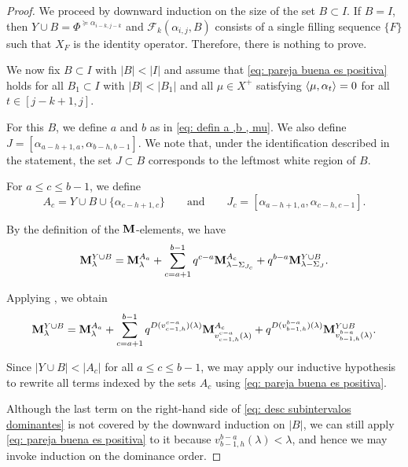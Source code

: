 \begin{proof}  
   We proceed by downward induction on the size of the set $B\subset I$. 
   If $B=I$, then $Y\cup B = \Phi^{\succeq \alpha_{i-k,j-k}}$ and $\mathcal{F}_{k}(\alpha_{i,j},B)$ consists of a single filling sequence $\{F\}$ such that $X_F$ is the identity operator. 
   Therefore, there is nothing to prove. 
   
   We now fix $B\subset I$ with $|B|<|I|$ and assume that \cref{eq: pareja buena es positiva} holds for all $B_1\subset I$ with $|B|<|B_1|$ and all $\mu \in X^+$ satisfying $\langle \mu , \alpha_t \rangle=0$ for all $t\in [j-k+1,j]$. 
   
   For this $B$, we define $a$ and $b$ as in \eqref{eq: defin a ,b , mu}.  
   We also define $J=[\alpha_{a-h+1,a}, \alpha_{b-h,b-1}]$.
   We note that, under the identification described in the statement, the set $J\subset B$ corresponds to the leftmost white region of $B$. 

   For $a\leq c \leq b-1$, we define
   \[
      A_c= Y\cup B \cup \{\alpha_{c-h+1,c}\}
      \qquad\text{and}\qquad
      J_c= [\alpha_{a-h+1,a}, \alpha_{c-h,c-1}].
   \]
   
   By the definition of the $\mathbf{M}$-elements, we have
 \begin{equation}  \label{eq: desc subintervalos}
    \mathbf{M}_{\lambda}^{Y\cup B} =   \mathbf{M}_{\lambda}^{A_a} +     \sum_{c=a+1}^{b-1} 
    q^{c-a}\mathbf{M}_{\lambda - \Sigma_{J_c} }^{A_{c} } +q^{b-a}\mathbf{M}_{\lambda-\Sigma_{J}}^{Y\cup B}  .
 \end{equation}
 
 Applying , we obtain
 \begin{equation}  \label{eq: desc subintervalos dominantes}
    \mathbf{M}_{\lambda}^{Y\cup B} = 
    \mathbf{M}_{\lambda}^{A_a} +  \sum_{c=a+1}^{b-1} q^{D(v_{c-1,h}^{c-a})(\lambda)}\mathbf{M}_{v_{c-1,h}^{c-a}(\lambda)}^{A_{c}}  + 
    q^{D(v_{b-1,h}^{b-a})(\lambda )}\mathbf{M}_{v_{b-1,h}^{b-a}(\lambda )}^{Y\cup B}. 
 \end{equation}

Since $|Y\cup B|<|A_c|$ for all $a\leq c \leq b-1$, we may apply our inductive hypothesis to rewrite all terms indexed by the sets $A_c$ using \cref{eq: pareja buena es positiva}. 

Although the last term on the right-hand side of \cref{eq: desc subintervalos dominantes} is not covered by the downward induction on $|B|$, we can still apply \cref{eq: pareja buena es positiva} to it because $v_{b-1,h}^{b-a}(\lambda )< \lambda$, and hence we may invoke induction on the dominance order. 


\end{proof}

